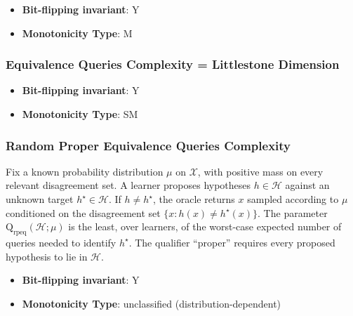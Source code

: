       \begin{definition}\label{def:occasional_one-sided_getback}
      
      \end{definition}
      \begin{itemize}
      \item {\bf Bit-flipping invariant}: Y
      \item {\bf Monotonicity Type}: M
      \end{itemize}
\subsubsection{Equivalence Queries Complexity = Littlestone Dimension}
      
      \begin{definition}[Equivalence Queries Complexity = Littlestone Dimension - {\begin{tabular}{l}$\mathrm{Q}_{\mathrm{eq}} = \mathrm{L}$\end{tabular}}]\label{def:equivalence_queries_complexity_=_littlestone_dimension}
      
      \end{definition}
      \begin{itemize}
      \item {\bf Bit-flipping invariant}: Y
      \item {\bf Monotonicity Type}: SM
      \end{itemize}
\subsubsection{Random Proper Equivalence Queries Complexity}
      
      \begin{definition}\label{def:random_proper_equivalence_queries_complexity}
      Fix a known probability distribution $\mu$ on $\mathcal X$, with positive mass on every relevant disagreement set.  A learner proposes hypotheses $h\in\mathcal H$ against an unknown target $h^\star\in\mathcal H$.  If $h\ne h^\star$, the oracle returns $x$ sampled according to $\mu$ conditioned on the disagreement set $\{x:h(x)\ne h^\star(x)\}$.  The parameter $\mathrm Q_{\mathrm{rpeq}}(\mathcal H;\mu)$ is the least, over learners, of the worst-case expected number of queries needed to identify $h^\star$.  The qualifier ``proper'' requires every proposed hypothesis to lie in $\mathcal H$.
      \end{definition}
      \begin{itemize}
      \item {\bf Bit-flipping invariant}: Y
      \item {\bf Monotonicity Type}: unclassified (distribution-dependent)
      \end{itemize}
